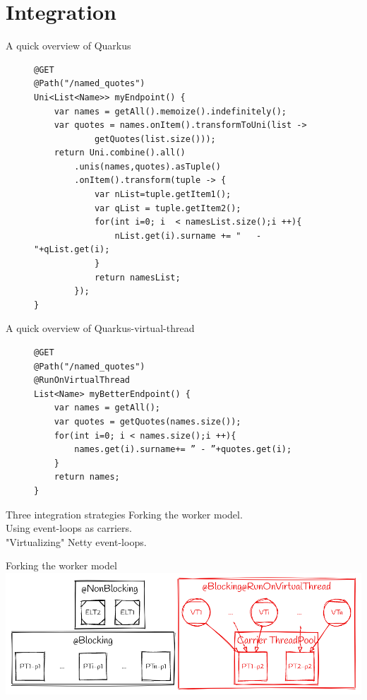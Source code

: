 \documentclass{beamer}
\begin{document}
\section{Integration}
\begin{frame}[fragile]{A quick overview of Quarkus}
\begin{figure}
    \begin{lstlisting}
@GET
@Path("/named_quotes")
Uni<List<Name>> myEndpoint() {
    var names = getAll().memoize().indefinitely();
    var quotes = names.onItem().transformToUni(list -> 
            getQuotes(list.size()));
    return Uni.combine().all()
        .unis(names,quotes).asTuple()
        .onItem().transform(tuple -> {
            var nList=tuple.getItem1();
            var qList = tuple.getItem2();
            for(int i=0; i  < namesList.size();i ++){
                nList.get(i).surname += "   -  "+qList.get(i);
            }
            return namesList;
        });
}
    \end{lstlisting}
\end{figure}
\end{frame}
\begin{frame}[fragile]{A quick overview of Quarkus-virtual-thread}
\begin{figure}
    \begin{lstlisting}
@GET
@Path("/named_quotes")
@RunOnVirtualThread
List<Name> myBetterEndpoint() {
    var names = getAll();
    var quotes = getQuotes(names.size());
    for(int i=0; i < names.size();i ++){
        names.get(i).surname+= ” - ”+quotes.get(i);
    }
    return names;
}
    \end{lstlisting}
\end{figure}
\end{frame}
\begin{frame}{Three integration strategies}
    \Large
    Forking the worker model.\\
    \vspace{1cm}
    Using event-loops as carriers.\\
    \vspace{1cm}
    "Virtualizing" Netty event-loops.
    \normalsize
\end{frame}
\begin{frame}{Forking the worker model}
    \includegraphics[width=\textwidth]{assets/forking_workers.png}
\end{frame}
\end{document}
